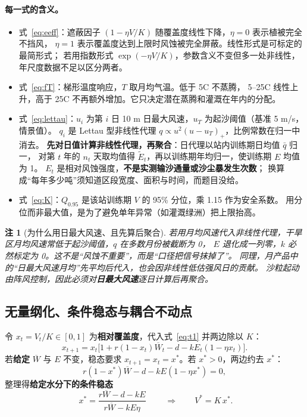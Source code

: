\documentclass[11pt,a4paper]{ctexart}
\newtheorem{remark}{注}
\begin{document}
\paragraph{每一式的含义。}
\begin{itemize}
\item 式~\eqref{eq:eeff}：遮蔽因子 $(1-\eta V/K)$ 随覆盖度线性下降，$\eta=0$ 表示植被完全不挡风，
$\eta=1$ 表示覆盖度达到上限时风蚀被完全屏蔽。线性形式是可标定的最简形式；
若用指数形式 $\exp(-\eta V/K)$，参数含义不变但多一处非线性，年尺度数据不足以区分两者。
\item 式~\eqref{eq:fT}：梯形温度响应，$T$ 取月均气温。低于 5\textdegree C 不蒸腾，
5--25\textdegree C 线性上升，高于 25\textdegree C 不再额外增加。它只决定潜在蒸腾和灌溉在年内的分配。
\item 式~\eqref{eq:lettau}：$u_i$ 为第 $i$ 日 10 m 日最大风速，$u_T$ 为起沙阈值（基准 5 m/s，情景值）。
$q_i$ 是 Lettau 型非线性代理 $q\propto u^2(u-u_T)_+$，比例常数在归一中消去。
\textbf{先对日值计算非线性代理，再聚合}：日代理以站内训练期日均值 $\bar q$ 归一，
对第 $t$ 年的 $n_t$ 天取均值得 $\tilde E_t$，再以训练期年均归一，使训练期 $E$ 均值为 1。
$E_t$ 是相对风蚀强度，\textbf{不是实测输沙通量或沙尘暴发生次数}；
换算成“每年多少吨”须知道区段宽度、面积与时间，而题目没给。
\item 式~\eqref{eq:K}：$Q_{0.95}$ 是该站训练期 $V$ 的 95\% 分位，乘 1.15 作为安全系数。
用分位而非最大值，是为了避免单年异常（如灌溉绿洲）把上限抬高。
\end{itemize}

\begin{remark}[为什么用日最大风速、且先算后聚合]
若用月均风速代入非线性代理，干旱区月均风速常低于起沙阈值，$q$ 在多数月份被截断为 0，
$E$ 退化成一列零，$k$ 必然标定为 0。这不是“风蚀不重要”，而是“口径把信号抹掉了”。
同理，月产品中的“日最大风速月均”先平均后代入，也会因非线性低估强风日的贡献。
沙粒起动由阵风控制，因此必须对\textbf{日最大风速}逐日计算后再聚合。
\end{remark}

\subsection{无量纲化、条件稳态与耦合不动点}

令 $x_t=V_t/K\in[0,1]$ 为\textbf{相对覆盖度}，代入式~\eqref{eq:t1} 并两边除以 $K$：
\begin{equation}\label{eq:x}
x_{t+1}=x_t\Big[1+r(1-x_t)\overline W_t-d-kE_t(1-\eta x_t)\Big].
\end{equation}
若\textbf{给定} $\overline W$ 与 $E$ 不变，稳态要求 $x_{t+1}=x_t=x^*$。若 $x^*>0$，两边约去 $x^*$：
\begin{equation}\label{eq:steady0}
r(1-x^*)\overline W-d-kE(1-\eta x^*)=0,
\end{equation}
整理得\textbf{给定水分下的条件稳态}
\begin{equation}\label{eq:xstar}
\boxed{\;x^*=\frac{r\overline W-d-kE}{r\overline W-kE\eta}\;}
\qquad\Longrightarrow\qquad
V^*=K\,x^*.
\end{equation}
\end{document}
